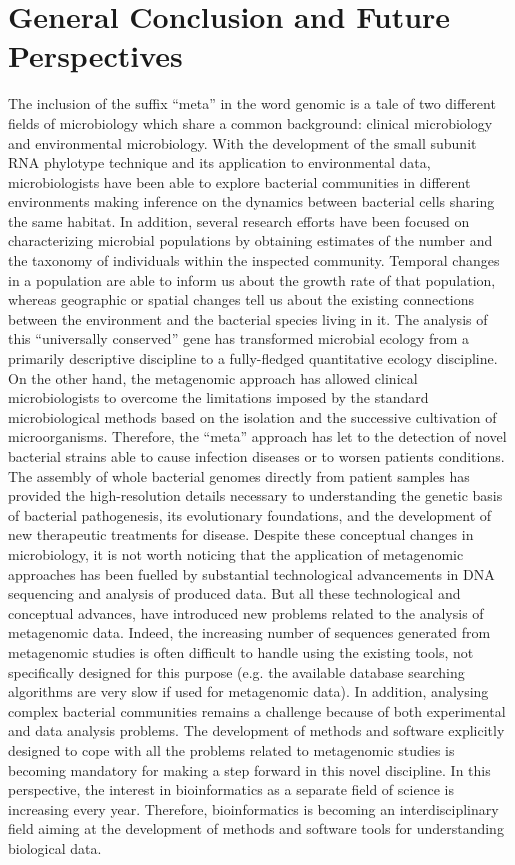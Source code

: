 \logvartrue
\chapter{General Conclusion and Future Perspectives}
The inclusion of the suffix ``meta'' in the word genomic is a tale of two different fields of microbiology which share a common background: clinical microbiology and environmental microbiology. With the development of the small subunit RNA phylotype technique and its application to environmental data, microbiologists have been able to explore bacterial communities in different environments making inference on the dynamics between bacterial cells sharing the same habitat. In addition, several research efforts have been focused on characterizing microbial populations by obtaining estimates of the number and the taxonomy of individuals within the inspected community. Temporal changes in a population are able to inform us about the growth rate of that population, whereas geographic or spatial changes tell us about the existing connections between the environment and the bacterial species living in it. The analysis of this ``universally conserved'' gene has transformed microbial ecology from a primarily descriptive discipline to a fully-fledged quantitative ecology discipline. On the other hand, the metagenomic approach has allowed clinical microbiologists to overcome the limitations imposed by the standard microbiological methods based on the isolation and the successive cultivation of microorganisms. Therefore, the ``meta'' approach has let to the detection of novel bacterial strains able to cause infection diseases or to worsen patients conditions. The assembly of whole bacterial genomes directly from patient samples has provided the high-resolution details necessary to understanding the genetic basis of bacterial pathogenesis, its evolutionary foundations, and the development of new therapeutic treatments for disease. Despite these conceptual changes in microbiology, it is not worth noticing that the application of metagenomic approaches has been fuelled by substantial technological advancements in DNA sequencing and analysis of produced data. But all these technological and conceptual advances, have introduced new problems related to the analysis of metagenomic data. Indeed, the increasing number of sequences generated from metagenomic studies is often difficult to handle using the existing tools, not specifically designed for this purpose (e.g. the available database searching algorithms are very slow if used for metagenomic data). In addition, analysing complex bacterial communities remains a challenge because of both experimental and data analysis problems. The development of methods and software explicitly designed to cope with all the problems related to metagenomic studies is becoming mandatory for making a step forward in this novel discipline. In this perspective, the interest in bioinformatics as a separate field of science is increasing every year. Therefore, bioinformatics is becoming an interdisciplinary field aiming at the development of methods and software tools for understanding biological data. 